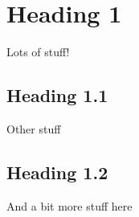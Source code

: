 \documentclass[a4paper,12pt]{report}
\begin{document}
\section{Heading 1}
Lots of stuff!
\subsection{Heading 1.1}
Other stuff
\subsection{Heading 1.2}
And a bit more stuff here
\end{document}
